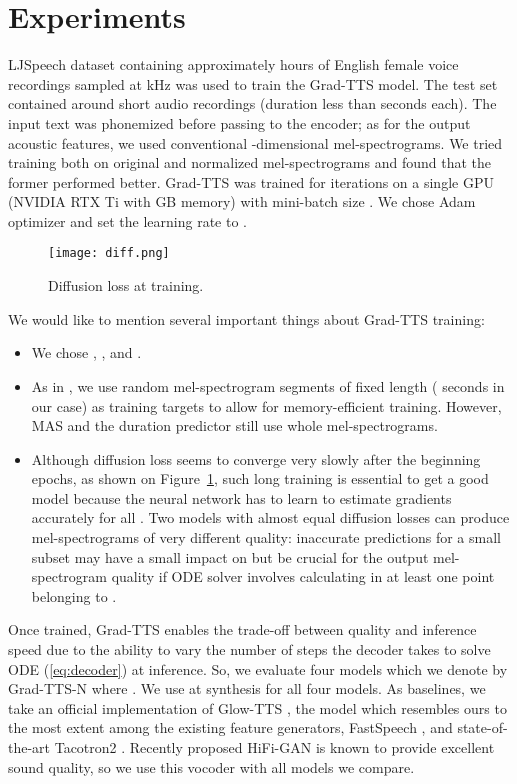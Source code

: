 \documentclass{article}
\begin{document}
\section{Experiments}
\label{sec:exp}

LJSpeech dataset \cite{LJSpeech} containing approximately  hours of English female voice recordings sampled at kHz was used to train the Grad-TTS model. The test set contained around  short audio recordings (duration less than  seconds each). The input text was phonemized before passing to the encoder; as for the output acoustic features, we used conventional -dimensional mel-spectrograms. We tried training both on original and normalized mel-spectrograms and found that the former performed better. Grad-TTS was trained for  iterations on a single GPU (NVIDIA RTX  Ti with GB memory) with mini-batch size . We chose Adam optimizer and set the learning rate to .

\begin{figure}[ht]
\vskip 0.1in
\begin{center}
\centerline{\texttt{[image: diff.png]}}
\caption{Diffusion loss at training.}
\label{fig:training}
\end{center}
\vskip -0.1in
\end{figure}

We would like to mention several important things about Grad-TTS training:

\begin{itemize}
    \item We chose , ,  and .
    \item As in \cite{GAN-TTS1, GAN-TTS2}, we use random mel-spectrogram segments of fixed length ( seconds in our case) as training targets  to allow for memory-efficient training. However, MAS and the duration predictor still use whole mel-spectrograms.
    \item Although diffusion loss  seems to converge very slowly after the beginning epochs, as shown on Figure~\ref{fig:training}, such long training is essential to get a good model because the neural network  has to learn to estimate gradients accurately for all . Two models with almost equal diffusion losses can produce mel-spectrograms of very different quality: inaccurate predictions for a small subset  may have a small impact on  but be crucial for the output mel-spectrogram quality if ODE solver involves calculating  in at least one point belonging to .
\end{itemize}

Once trained, Grad-TTS enables the trade-off between quality and inference speed due to the ability to vary the number of steps  the decoder takes to solve ODE (\ref{eq:decoder}) at inference. So, we evaluate four models which we denote by Grad-TTS-N where . We use  at synthesis for all four models. As baselines, we take an official implementation of Glow-TTS \cite{GlowTTS}, the model which resembles ours to the most extent among the existing feature generators, FastSpeech \cite{FastSpeech}, and state-of-the-art Tacotron2 \cite{Tacotron2}. Recently proposed HiFi-GAN \cite{HiFi-GAN} is known to provide excellent sound quality, so we use this vocoder with all models we compare.
\end{document}
